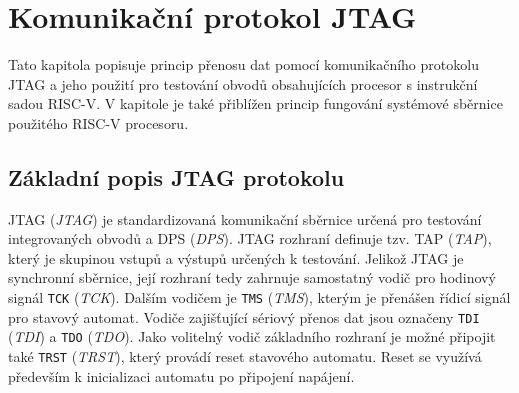 \chapter{Komunikační protokol JTAG}
Tato kapitola popisuje princip přenosu dat pomocí komunikačního protokolu JTAG a jeho použití pro testování obvodů obsahujících procesor s instrukční sadou \acs{RISC-V}. V kapitole je také přiblížen princip fungování systémové sběrnice použitého \acs{RISC-V} procesoru.

\section{Základní popis \acs{JTAG} protokolu}
\acs{JTAG} (\textit{\acl{JTAG}}) je standardizovaná komunikační sběrnice určená pro testování integrovaných obvodů a \acs{DPS} (\textit{\acl{DPS}}).
\acs{JTAG} rozhraní definuje tzv. \acs{TAP} (\textit{\acl{TAP}}), který je skupinou vstupů a výstupů určených k testování. Jelikož \acs{JTAG} je synchronní sběrnice, její rozhraní tedy zahrnuje samostatný vodič pro hodinový signál \texttt{\acs{TCK}} (\textit{\acl{TCK}}). Dalším vodičem je \texttt{\acs{TMS}} (\textit{\acl{TMS}}), kterým je přenášen řídicí signál pro stavový automat. Vodiče zajišťující sériový přenos dat jsou označeny \texttt{\acs{TDI}} (\textit{\acl{TDI}}) a \texttt{\acs{TDO}} (\textit{\acl{TDO}}). Jako volitelný vodič základního rozhraní je možné připojit také \texttt{\acs{TRST}} (\textit{\acl{TRST}}), který provádí reset stavového automatu. Reset se využívá především k inicializaci automatu po připojení napájení. \cite {IEEE_1149-1} \cite{JTAG}

